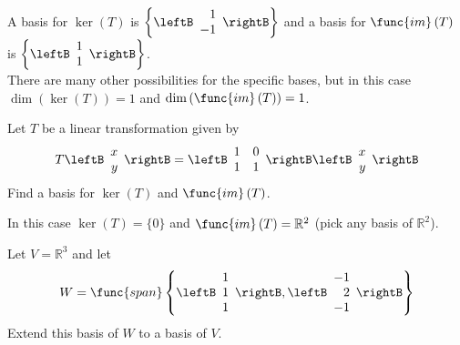 \begin{enumialphparenastyle}
\begin{ex}
\begin{sol}
A basis for $\ker \left( T\right)$ is 
$\left\{ \leftB 
\begin{array}{r}
1 \\ 
-1 
\end{array}
\rightB \right\}$ 
and a basis for $\func{im} \left( T\right)$ is 
$\left\{ \leftB 
\begin{array}{r}
1 \\ 
1 
\end{array}
\rightB \right\}$. \\
There are many other possibilities for the specific bases, but in this case 
$\dim \left( \ker \left( T\right) \right)=1 $ and $\dim \left( \func{im} \left( T\right) \right)=1$.
\end{sol}

\end{ex}


\begin{ex}
 Let $T$ be a linear transformation given by 
\[
T \leftB \begin{array}{r}
x\\
y
\end{array}\rightB = \leftB \begin{array}{rrr}
1 & 0  \\
1 & 1
\end{array}\rightB
\leftB \begin{array}{r}
x\\
y
\end{array}\rightB
\]
Find a basis for $\ker \left( T\right)$ and $\func{im}
\left( T\right) $.

\begin{sol}
In this case $\ker \left( T\right) =\{0\}$ 
and $\func{im} \left( T\right) = \mathbb{R}^2$ (pick any basis of $\mathbb{R}^2$). 
\end{sol}

\end{ex}



\begin{ex}
Let $V=\mathbb{R}^{3}$ and let 
\begin{equation*}
W=\func{span}\left\{ \leftB 
\begin{array}{r}
1 \\ 
1 \\ 
1
\end{array}
\rightB ,\leftB 
\begin{array}{r}
-1 \\ 
2 \\ 
-1
\end{array}
\rightB \right\}
\end{equation*}
Extend this basis of $W$ to a basis of $V$.


\end{ex}
\end{enumialphparenastyle}
